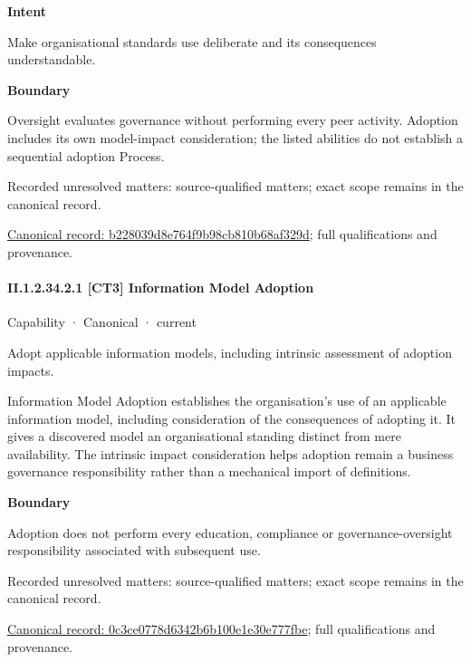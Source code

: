 \textbf{Intent}



Make organisational standards use deliberate and its consequences understandable.



\textbf{Boundary}



Oversight evaluates governance without performing every peer activity. Adoption includes its own model-impact consideration; the listed abilities do not establish a sequential adoption Process.


{\small Recorded unresolved matters: source-qualified matters; exact scope remains in the canonical record.}\par
{\footnotesize \href{../../../../continuum/strategy/capability/b228039d8e764f9b98cb810b68af329d.md}{Canonical record: b228039d8e764f9b98cb810b68af329d}; full qualifications and provenance.}\par
\paragraph*{II.1.2.34.2.1 [CT3] Information Model Adoption}
\label{navigation:II.1.2.34.2.1}

\label{element:0c3ce0778d6342b6b100e1e30e777fbe}
{\small Capability · Canonical · current}\par

Adopt applicable information models, including intrinsic assessment of adoption impacts.



Information Model Adoption establishes the organisation's use of an applicable information model, including consideration of the consequences of adopting it. It gives a discovered model an organisational standing distinct from mere availability. The intrinsic impact consideration helps adoption remain a business governance responsibility rather than a mechanical import of definitions.



\textbf{Boundary}



Adoption does not perform every education, compliance or governance-oversight responsibility associated with subsequent use.


{\small Recorded unresolved matters: source-qualified matters; exact scope remains in the canonical record.}\par
{\footnotesize \href{../../../../continuum/strategy/capability/0c3ce0778d6342b6b100e1e30e777fbe.md}{Canonical record: 0c3ce0778d6342b6b100e1e30e777fbe}; full qualifications and provenance.}\par
